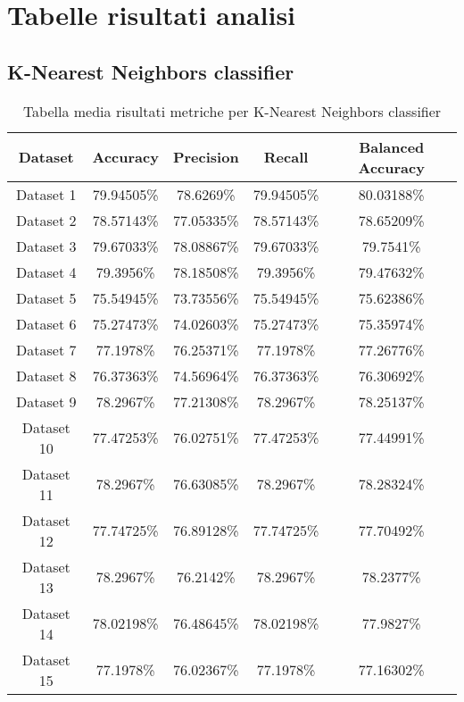 \chapter{Tabelle risultati analisi}
\label{chap:tabelle_risultati_analisi}
\newpage

\section{K-Nearest Neighbors classifier}
\begin{table}
\centering
\caption{Tabella media risultati metriche per K-Nearest Neighbors classifier}
\label{tab:3}
\begin{tabular}{ |c||c|c|c|c| } 
    \hline
    Dataset & Accuracy & Precision & Recall & Balanced Accuracy\\ 
    \hline\hline
    Dataset 1 & 79.94505\% & 78.6269\% & 79.94505\% & 80.03188\%\\
    \hline
    Dataset 2 & 78.57143\% & 77.05335\% & 78.57143\% & 78.65209\%\\
    \hline
    Dataset 3 & 79.67033\% & 78.08867\% & 79.67033\% & 79.7541\%\\
    \hline
    Dataset 4 & 79.3956\% & 78.18508\% & 79.3956\% & 79.47632\%\\
    \hline
    Dataset 5 & 75.54945\% & 73.73556\% & 75.54945\% & 75.62386\%\\
    \hline
    Dataset 6 & 75.27473\% & 74.02603\% & 75.27473\% & 75.35974\%\\
    \hline
    Dataset 7 & 77.1978\% & 76.25371\% & 77.1978\% & 77.26776\%\\
    \hline
    Dataset 8 & 76.37363\% & 74.56964\% & 76.37363\% & 76.30692\%\\
    \hline
    Dataset 9 & 78.2967\% & 77.21308\% & 78.2967\% & 78.25137\%\\
    \hline
    Dataset 10 & 77.47253\% & 76.02751\% & 77.47253\% & 77.44991\%\\
    \hline
    Dataset 11 & 78.2967\% & 76.63085\% & 78.2967\% & 78.28324\%\\
    \hline
    Dataset 12 & 77.74725\% & 76.89128\% & 77.74725\% & 77.70492\%\\
    \hline
    Dataset 13 & 78.2967\% & 76.2142\% & 78.2967\% & 78.2377\%\\
    \hline
    Dataset 14 & 78.02198\% & 76.48645\% & 78.02198\% & 77.9827\%\\
    \hline
    Dataset 15 & 77.1978\% & 76.02367\% & 77.1978\% & 77.16302\%\\

\end{tabular}
\end{table}
